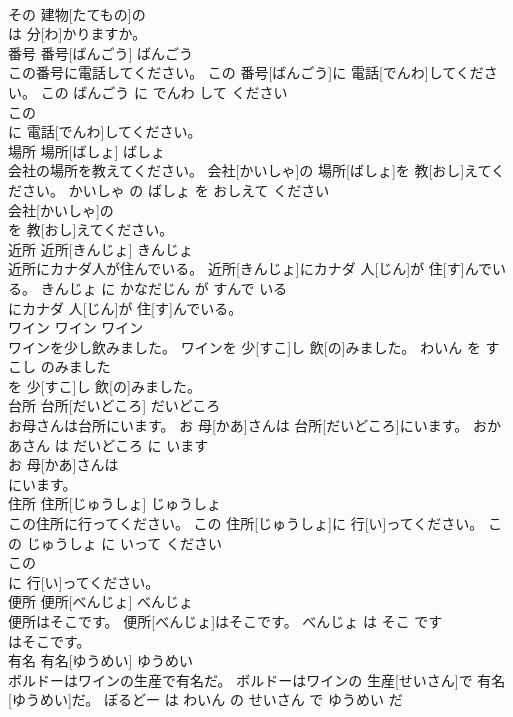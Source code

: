 \documentclass[8pt]{extreport}
\begin{document}
\begin{CJK}{UTF8}{min}
\\	その 建物[たてもの]の
\\	は 分[わ]かりますか。			
\\	番号	番号[ばんごう]	ばんごう	
\\	この番号に電話してください。	この 番号[ばんごう]に 電話[でんわ]してください。	この ばんごう に でんわ して ください	
\\	この
\\	に 電話[でんわ]してください。			
\\	場所	場所[ばしょ]	ばしょ	
\\	会社の場所を教えてください。	会社[かいしゃ]の 場所[ばしょ]を 教[おし]えてください。	かいしゃ の ばしょ を おしえて ください	
\\	会社[かいしゃ]の
\\	を 教[おし]えてください。			
\\	近所	近所[きんじょ]	きんじょ	
\\	近所にカナダ人が住んでいる。	近所[きんじょ]にカナダ 人[じん]が 住[す]んでいる。	きんじょ に かなだじん が すんで いる	
\\	にカナダ 人[じん]が 住[す]んでいる。			
\\	ワイン	ワイン	ワイン	
\\	ワインを少し飲みました。	ワインを 少[すこ]し 飲[の]みました。	わいん を すこし のみました	
\\	を 少[すこ]し 飲[の]みました。			
\\	台所	台所[だいどころ]	だいどころ	
\\	お母さんは台所にいます。	お 母[かあ]さんは 台所[だいどころ]にいます。	おかあさん は だいどころ に います	
\\	お 母[かあ]さんは
\\	にいます。			
\\	住所	住所[じゅうしょ]	じゅうしょ	
\\	この住所に行ってください。	この 住所[じゅうしょ]に 行[い]ってください。	この じゅうしょ に いって ください	
\\	この
\\	に 行[い]ってください。			
\\	便所	便所[べんじょ]	べんじょ	
\\	便所はそこです。	便所[べんじょ]はそこです。	べんじょ は そこ です	
\\	はそこです。			
\\	有名	有名[ゆうめい]	ゆうめい	
\\	ボルドーはワインの生産で有名だ。	ボルドーはワインの 生産[せいさん]で 有名[ゆうめい]だ。	ぼるどー は わいん の せいさん で ゆうめい だ	

\end{CJK}
\end{document}
